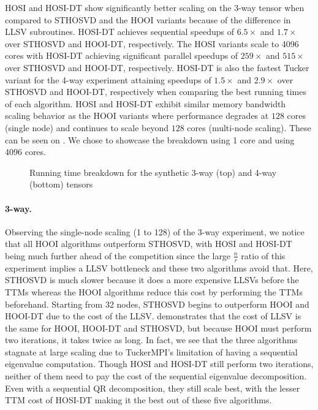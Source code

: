     HOSI and HOSI-DT show significantly better scaling on the 3-way tensor when
    compared to STHOSVD and the HOOI variants because of the difference in LLSV
    subroutines. HOSI-DT achieves sequential speedups of $6.5\times$ and
    $1.7\times$ over STHOSVD and HOOI-DT, respectively. The HOSI variants scale
    to 4096 cores with HOSI-DT achieving significant parallel speedups of
    $259\times$ and $515\times$ over STHOSVD and HOOI-DT, respectively. HOSI-DT
    is also the fastest Tucker variant for the 4-way experiment attaining
    speedups of $1.5\times$ and $2.9\times$ over STHOSVD and HOOI-DT,
    respectively when comparing the best running times of each algorithm. HOSI
    and HOSI-DT exhibit similar memory bandwidth scaling behavior as the HOOI
    variants where performance degrades at $128$ cores (single node) and
    continues to scale beyond $128$ cores (multi-node scaling).
    These can be seen on . We chose to showcase the
    breakdown using 1 core and using 4096 cores.

    \begin{figure}
        \centering
        
        \caption[Running Time Breakdown for Sunthetic Datasets]{Running time breakdown for the synthetic 3-way (top) and 4-way (bottom) tensors}
        \label{fig:scaling_breakdown}
    \end{figure}
    
    \paragraph{3-way.} Observing the single-node scaling (1 to 128) of the 3-way
    experiment, we notice that all HOOI algorithms outperform STHOSVD, with
    HOSI and HOSI-DT being much further ahead of the competition since the large
    $\frac{n}{r}$ ratio of this experiment implies a LLSV bottleneck and these
    two algorithms avoid that. Here, STHOSVD is much slower because it does a
    more expensive LLSVs before the TTMs whereas the HOOI algorithms reduce this
    cost by performing the TTMs beforehand. Starting from 32 nodes, STHOSVD
    begins to outperform HOOI and HOOI-DT due to the cost of the LLSV.
     demonstrates that the cost of LLSV is the same
    for HOOI, HOOI-DT and STHOSVD, but because HOOI must perform two
    iterations, it takes twice as long. In fact, we see that the three
    algorithms stagnate at large scaling due to TuckerMPI's limitation of having
    a sequential eigenvalue computation. Though HOSI and HOSI-DT still perform
    two iterations, neither of them need to pay the cost of the sequential
    eigenvalue decomposition. Even with a sequential QR decomposition, they
    still scale best, with the lesser TTM cost of HOSI-DT making it the best out
    of these five algorithms.

